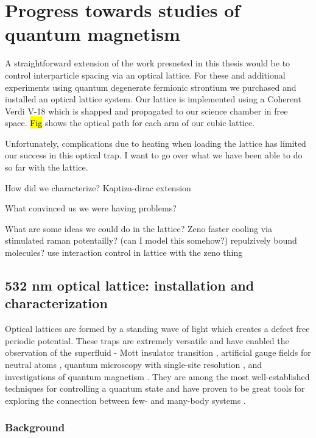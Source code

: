 \chapter{Progress towards studies of quantum magnetism}
\label{ch:chap6}

A straightforward extension of the work presneted in this thesis would be to control interparticle spacing via an optical lattice. For these and additional experiments using quantum degenerate fermionic strontium we purchased and installed an optical lattice system. Our lattice is implemented using a Coherent Verdi V-18 which is shapped and propagated to our science chamber in free space. \hl{Fig} shows the optical path for each arm of our cubic lattice. 

Unfortunately, complications due to heating when loading the lattice has limited our success in this optical trap. I want to go over what we have been able to do so far with the lattice.

How did we characterize?
	Kaptiza-dirac extension
	
What convinced us we were having problems?

What are some ideas we could do in the lattice?
	Zeno
	faster cooling via stimulated raman potentailly? (can I model this somehow?)
	repulzively bound molecules?
	use interaction control in lattice with the zeno thing
	
	

\section{532 nm optical lattice: installation and characterization}
\label{sec:lattice}

Optical lattices are formed by a standing wave of light which creates a defect free periodic potential. These traps are extremely versatile and have enabled the observation of the superfluid - Mott insulator transition \cite{Greiner2002}, artificial gauge fields for neutral atoms \cite{Lin2011}, quantum microscopy with single-site resolution \cite{Bakr2009}, and investigations of quantum magnetism \cite{Hart2015,Greif2015}. They are among the most well-established techniques for controlling a quantum state and have proven to be great tools for exploring the connection between few- and many-body systems \cite{Bloch2008}.

\subsection{Background}
\label{ssec:lattice_background}

